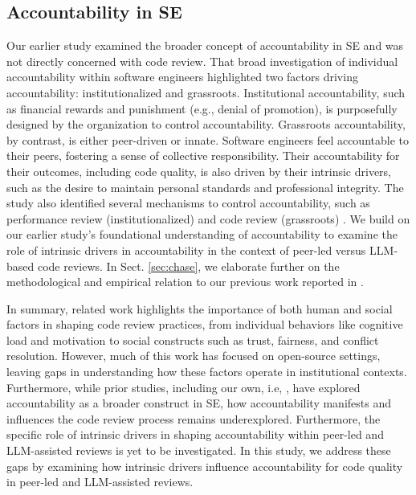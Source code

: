 \subsection{Accountability in SE}

Our earlier study \citep{alami2024understanding} examined the broader concept of accountability in SE and was not directly concerned with code review. That broad investigation of individual accountability within software engineers highlighted two factors driving accountability: institutionalized and grassroots. Institutional accountability, such as financial rewards and punishment (e.g., denial of promotion), is purposefully designed by the organization to control accountability. Grassroots accountability, by contrast, is either peer-driven or innate. Software engineers feel accountable to their peers, fostering a sense of collective responsibility. Their accountability for their outcomes, including code quality, is also driven by their intrinsic drivers, such as the desire to maintain personal standards and professional integrity. The study also identified several mechanisms to control accountability, such as performance review (institutionalized) and code review (grassroots) \citep{alami2024understanding}. We build on our earlier study's foundational understanding of accountability to examine the role of intrinsic drivers in accountability in the context of peer-led versus LLM-based code reviews. In Sect. \ref{sec:chase}, we elaborate further on the methodological and empirical relation to our previous work reported in \citep{alami2024understanding}.

In summary, related work highlights the importance of both human and social factors in shaping code review practices, from individual behaviors like cognitive load and motivation to social constructs such as trust, fairness, and conflict resolution. However, much of this work has focused on open-source settings, leaving gaps in understanding how these factors operate in institutional contexts. Furthermore, while prior studies, including our own, i.e, \citep{alami2024understanding}, have explored accountability as a broader construct in SE, how accountability manifests and influences the code review process remains underexplored. Furthermore, the specific role of intrinsic drivers in shaping accountability within peer-led and LLM-assisted reviews is yet to be investigated. In this study, we address these gaps by examining how intrinsic drivers influence accountability for code quality in peer-led and LLM-assisted reviews.

